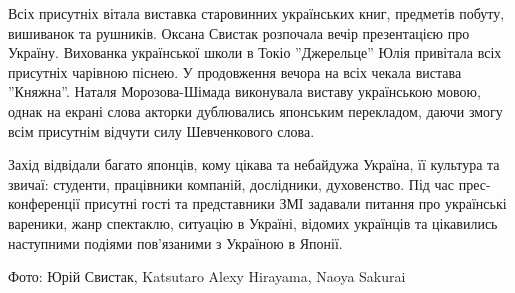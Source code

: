 \documentclass[10pt,a4paper]{article}
\begin{document}
\begin{multicols}{3}
Всіх присутніх вітала виставка старовинних українських книг, предметів побуту, вишиванок та рушників. Оксана Свистак розпочала вечір презентацією про Україну. Вихованка української школи в Токіо ''Джерельце'' Юлія привітала всіх присутніх чарівною піснею. У продовження вечора на всіх чекала вистава ''Княжна''. Наталя Морозова-Шімада виконувала виставу українською мовою, однак на екрані слова акторки дублювались японським перекладом, даючи змогу всім присутнім відчути силу Шевченкового слова.

Захід відвідали багато японців, кому цікава та небайдужа Україна, її культура та звичаї: студенти, працівники компаній, дослідники, духовенство. Під час прес-конференції присутні гості та представники ЗМІ задавали питання про українські вареники, жанр спектаклю, ситуацію в Україні, відомих українців та цікавились наступними подіями пов'язаними з Україною в Японії.

Фото: Юрій Свистак, Katsutaro Alexy Hirayama, Naoya Sakurai
\end{multicols}

\newpage
\end{document}
